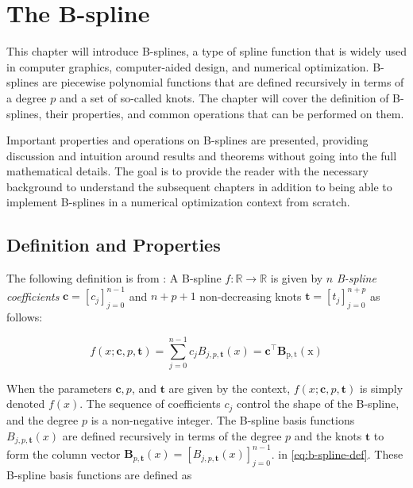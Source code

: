 
\chapter{The B-spline}
\label{chap:b-spline-theory}
This chapter will introduce B-splines, a type of spline function that is widely used in computer graphics, computer-aided design, and numerical optimization. B-splines are piecewise polynomial functions that are defined recursively in terms of a degree $p$ and a set of so-called knots. The chapter will cover the definition of B-splines, their properties, and common operations that can be performed on them. 

Important properties and operations on B-splines are presented, providing discussion and intuition around results and theorems without going into the full mathematical details. The goal is to provide the reader with the necessary background to understand the subsequent chapters in addition to being able to implement B-splines in a numerical optimization context from scratch.

\section{Definition and Properties}\label{sec:b-spline-definition}
The following definition is from \cite{Grimstad2016}:
A B-spline $f: \mathbb R \rightarrow \mathbb R$ is given by $n$ \emph{B-spline coefficients} $\mathbf c = [c_j]_{j=0}^{n-1}$ and $n+p+1$ non-decreasing knots $\mathbf t = [t_j]_{j=0}^{n+p}$ as follows:

\begin{equation}\label{eq:b-spline-def}
    f(x ; \mathbf{c}, p, \mathbf{t})=\sum_{j=0}^{n-1} c_j B_{j, p, \mathbf{t}}(x)=\mathbf{c}^{\top} \mathbf{B}_{\mathrm{p}, \mathrm{t}}(\mathrm{x})
\end{equation}

When the parameters $\mathbf{c}, p$, and $\mathbf{t}$ are given by the context, $f(x ; \mathbf{c}, p, \mathbf{t})$ is simply denoted $f(x)$. The sequence of coefficients $c_j$ control the shape of the B-spline, and the degree $p$ is a non-negative integer. The B-spline basis functions $B_{j, p, \mathbf{t}}(x)$ are defined recursively in terms of the degree $p$ and the knots $\mathbf t$ to form the column vector $\mathbf{B}_{p, \mathbf{t}}(x) = [B_{j, p, \mathbf{t}}(x)]_{j=0}^{n-1}$. 
in \cref{eq:b-spline-def}. These B-spline basis functions are defined as

